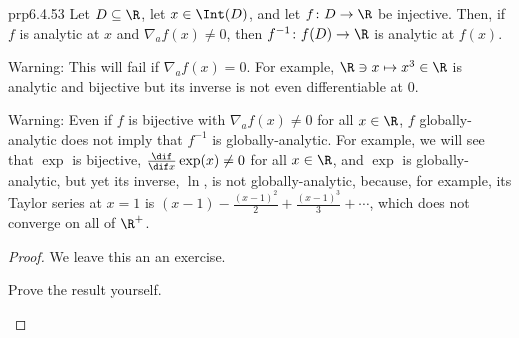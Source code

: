 \begin{prp}{}{prp6.4.53}
Let $D\subseteq \R$, let $x\in \Int (D)$, and let $f\colon D\rightarrow \R$ be injective.  Then, if $f$ is analytic at $x$ and $\nabla _af(x)\neq 0$, then $f^{-1}\colon f(D)\rightarrow \R$ is analytic at $f(x)$.
\begin{wrn}
Warning:  This will fail if $\nabla _af(x)=0$.  For example, $\R \ni x\mapsto x^3\in \R$ is analytic and bijective but its inverse is not even differentiable at $0$.
\end{wrn}
\begin{wrn}
Warning:  Even if $f$ is bijective with $\nabla _af(x)\neq 0$ for all $x\in \R$, $f$ globally-analytic does not imply that $f^{-1}$ is globally-analytic.  For example, we will see that $\exp$ is bijective, $\frac{\dif}{\dif x}\exp (x)\neq 0$ for all $x\in \R$, and $\exp$ is globally-analytic, but yet its inverse, $\ln$, is not globally-analytic, because, for example, its Taylor series at $x=1$ is $(x-1)-\frac{(x-1)^2}{2}+\frac{(x-1)^3}{3}+\cdots$, which does not converge on all of $\R ^+$.
\end{wrn}
\begin{proof}
We leave this an an exercise.
\begin{exr}[breakable=false]{}{}
Prove the result yourself.
\end{exr}
\end{proof}
\end{prp}

